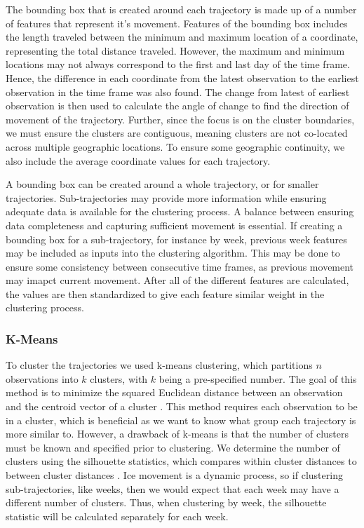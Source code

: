 \documentclass[12pt]{article}
\begin{document}
The bounding box that is created around each trajectory is made up of a
number of features that represent it's movement. Features of the
bounding box includes the length traveled between the minimum and
maximum location of a coordinate, representing the total distance
traveled. However, the maximum and minimum locations may not always
correspond to the first and last day of the time frame. Hence, the
difference in each coordinate from the latest observation to the
earliest observation in the time frame was also found. The change from
latest of earliest observation is then used to calculate the angle of
change to find the direction of movement of the trajectory. Further,
since the focus is on the cluster boundaries, we must ensure the
clusters are contiguous, meaning clusters are not co-located across
multiple geographic locations. To ensure some geographic continuity, we
also include the average coordinate values for each trajectory.

A bounding box can be created around a whole trajectory, or for smaller
trajectories. Sub-trajectories may provide more information while
ensuring adequate data is available for the clustering process. A
balance between ensuring data completeness and capturing sufficient
movement is essential. If creating a bounding box for a sub-trajectory,
for instance by week, previous week features may be included as inputs
into the clustering algorithm. This may be done to ensure some
consistency between consecutive time frames, as previous movement may
imapct current movement. After all of the different features are
calculated, the values are then standardized to give each feature
similar weight in the clustering process.

\hypertarget{k-means}{%
\subsubsection{K-Means}\label{k-means}}

To cluster the trajectories we used k-means clustering, which partitions
\(n\) observations into \(k\) clusters, with \(k\) being a pre-specified
number. The goal of this method is to minimize the squared Euclidean
distance between an observation and the centroid vector of a cluster
\citep{steinley_kmeans_2006}. This method requires each observation to
be in a cluster, which is beneficial as we want to know what group each
trajectory is more similar to. However, a drawback of k-means is that
the number of clusters must be known and specified prior to clustering.
We determine the number of clusters using the silhouette statistics,
which compares within cluster distances to between cluster distances
\citep{kodinariya_2013}. Ice movement is a dynamic process, so if
clustering sub-trajectories, like weeks, then we would expect that each
week may have a different number of clusters. Thus, when clustering by
week, the silhouette statistic will be calculated separately for each
week.
\end{document}
